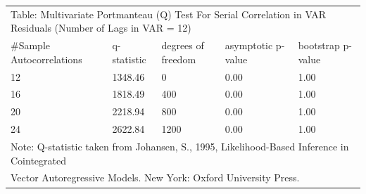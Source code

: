 \documentclass{article}
\begin{document}
 \begin{tabular}{lllll} 
 \multicolumn{5}{l}{Table: Multivariate Portmanteau (Q) Test For Serial 
     Correlation in VAR Residuals (Number of Lags in VAR = 12)} \\ 
 \#Sample Autocorrelations & q-statistic & degrees of freedom & asymptotic 
     p-value & bootstrap p-value \\ 
  12   & 1348.46 &   0 & 0.00 & 1.00 \\  
  16   & 1818.49 & 400 & 0.00 & 1.00 \\  
  20   & 2218.94 & 800 & 0.00 & 1.00 \\  
  24   & 2622.84 & 1200 & 0.00 & 1.00 \\ 
 \multicolumn{5}{l}{Note: Q-statistic taken from Johansen, S., 1995, 
 Likelihood-Based Inference in Cointegrated } \\  
 \multicolumn{5}{l}{Vector Autoregressive Models. New York: Oxford University 
 Press.} 
   \end{tabular} 
\end{document}
